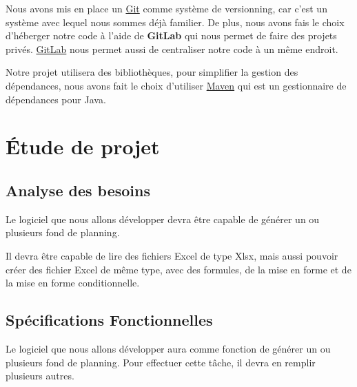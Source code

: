 \documentclass{polytech/polytech}
\begin{document}
	Nous avons mis en place un \href{https://git-scm.com/}{Git} comme système de versionning, car c'est un système avec lequel nous sommes déjà familier.
	De plus, nous avons fais le choix d'héberger notre code à l'aide de \textbf{GitLab} qui nous permet de faire des projets privés.
	\href{https://about.gitlab.com/}{GitLab} nous permet aussi de centraliser notre code à un même endroit.

	Notre projet utilisera des bibliothèques, pour simplifier la gestion des dépendances, nous avons fait le choix d'utiliser \href{https://maven.apache.org/}{Maven} qui est un gestionnaire de dépendances pour Java.

	\chapter{Étude de projet}
	\section{Analyse des besoins}

	Le logiciel que nous allons développer devra être capable de générer un ou plusieurs fond de planning.

	Il devra être capable de lire des fichiers Excel de type Xlsx,
	mais aussi pouvoir créer des fichier Excel de même type, avec des formules, de la mise en forme et de la mise en forme conditionnelle.

	\section{Spécifications Fonctionnelles}

	Le logiciel que nous allons développer aura comme fonction de générer un ou plusieurs fond de planning. Pour effectuer cette tâche, il devra en remplir plusieurs autres.
\end{document}
